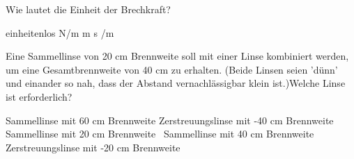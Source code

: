 \documentclass[11pt]{exam}
\begin{document}
\begin{questions}
\vspace{3mm}\question Wie lautet die Einheit der Brechkraft?

\begin{choices}
	\choice einheitenlos
	\choice N/m
	\choice m
	\choice s
	/m
\end{choices}

\vspace{3mm}\question Eine Sammellinse von 20 cm Brennweite soll mit einer Linse kombiniert werden, um eine Gesamtbrennweite von 40 cm zu erhalten. (Beide Linsen seien ’dünn’ und einander so nah, dass der Abstand vernachlässigbar klein ist.)Welche Linse ist erforderlich?

\begin{choices}
	\choice Sammellinse mit 60 cm Brennweite
	\choice Zerstreuungslinse mit -40 cm Brennweite
	\choice Sammellinse mit 20 cm Brennweite
	\choice  Sammellinse mit 40 cm Brennweite
	\choice Zerstreuungslinse mit -20 cm Brennweite
\end{choices}

\vspace{3mm}\end{questions}
\end{document}
